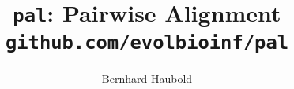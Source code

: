 \documentclass[a4paper]{article}
\begin{document}
\pagestyle{noweb}

\title{\texttt{pal}: Pairwise Alignment\\
\small \texttt{github.com/evolbioinf/pal}}
\author{Bernhard Haubold}
\maketitle
\tableofcontents





\end{document}
